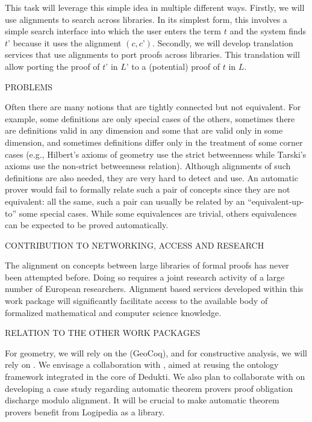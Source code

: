 This task will leverage this simple idea in multiple different
ways. Firstly, we will use alignments to search across libraries. In
its simplest form, this involves a simple search interface into which
the user enters the term $t$ and the system finds $t’$ because it uses
the alignment $(c,c’)$. Secondly, we will develop translation services
that use alignments to port proofs across libraries. This translation
will allow porting the proof of $t’$ in $L’$ to a (potential) proof of
$t$ in $L$.


{\color{red} PROBLEMS}

Often there are many notions that are tightly connected but not
equivalent. For example, some definitions are only special cases of
the others, sometimes there are definitions valid in any dimension and
some that are valid only in some dimension, and sometimes definitions
differ only in the treatment of some corner cases (e.g., Hilbert's
axioms of geometry use the strict betweenness while Tarski's axioms
use the non-strict betweenness relation).  Although alignments of such
definitions are also needed, they are very hard to detect and use. An
automatic prover would fail to formally relate such a pair of concepts
since they are not equivalent: all the same, such a pair can usually
be related by an ``equivalent-up-to'' some special cases.  While some
equivalences are trivial, others equivalences can be expected to be
proved automatically.

{\color{red} CONTRIBUTION TO NETWORKING, ACCESS AND RESEARCH}

The alignment on concepts between large libraries of formal proofs has
never been attempted before.  Doing so requires a joint research
activity of a large number of European researchers.  Alignment based
services developed within this work package will significantly
facilitate access to the available body of formalized mathematical and
computer science knowledge.

{\color{red} RELATION TO THE OTHER WORK PACKAGES}

For geometry, we will rely on the 
(GeoCoq), and for constructive analysis, we will rely on
. We envisage a collaboration with
, aimed at reusing the ontology framework
integrated in the core of Dedukti. We also plan to collaborate with
 on developing a case study regarding automatic theorem provers proof
obligation discharge modulo alignment. It will be crucial to make
automatic theorem provers benefit from Logipedia as a library.

